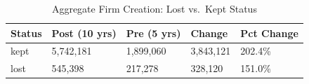 \begin{table}[!h]
\centering
\caption{\label{tab:tab:displacement}Aggregate Firm Creation: Lost vs.\ Kept Status}
\centering
\begin{tabular}[t]{lllll}
\toprule
Status & Post (10 yrs) & Pre (5 yrs) & Change & Pct Change\\
\midrule
kept & 5,742,181 & 1,899,060 & 3,843,121 & 202.4\%\\
lost & 545,398 & 217,278 & 328,120 & 151.0\%\\
\bottomrule
\end{tabular}
\end{table}
